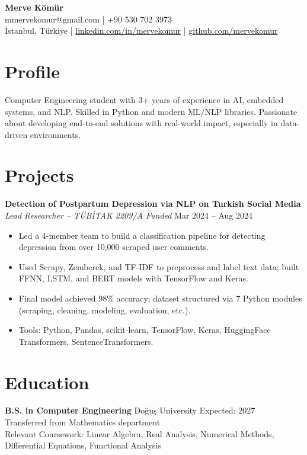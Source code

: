 \documentclass[10.8pt]{article} %
\begin{document}
\begin{center}
    {\LARGE \textbf{Merve Kömür}} \\
    \small mmervekomur@gmail.com \quad | \quad +90 530 702 3973 \\
    İstanbul, Türkiye \quad | \quad 
    \href{https://linkedin.com/in/mervekomur}{linkedin.com/in/mervekomur} \quad | \quad
    \href{https://github.com/mervekomur}{github.com/mervekomur}
\end{center}

\section*{Profile}
Computer Engineering student with 3+ years of experience in AI, embedded systems, and NLP. Skilled in Python and modern ML/NLP libraries. Passionate about developing end-to-end solutions with real-world impact, especially in data-driven environments.

\section*{Projects}
\textbf{Detection of Postpartum Depression via NLP on Turkish Social Media} \\
\textit{Lead Researcher – TÜBİTAK 2209/A Funded} \hfill Mar 2024 – Aug 2024
\begin{itemize}
  \item Led a 4-member team to build a classification pipeline for detecting depression from over 10,000 scraped user comments.
  \item Used Scrapy, Zemberek, and TF-IDF to preprocess and label text data; built FFNN, LSTM, and BERT models with TensorFlow and Keras.
  \item Final model achieved 98\% accuracy; dataset structured via 7 Python modules (scraping, cleaning, modeling, evaluation, etc.).
  \item Tools: Python, Pandas, scikit-learn, TensorFlow, Keras, HuggingFace Transformers, SentenceTransformers.
\end{itemize}

\section*{Education}
\textbf{B.S. in Computer Engineering} \hfill Doğuş University \hfill Expected: 2027 \\
Transferred from Mathematics department \\
Relevant Coursework: Linear Algebra, Real Analysis, Numerical Methods, Differential Equations, Functional Analysis
\end{document}
